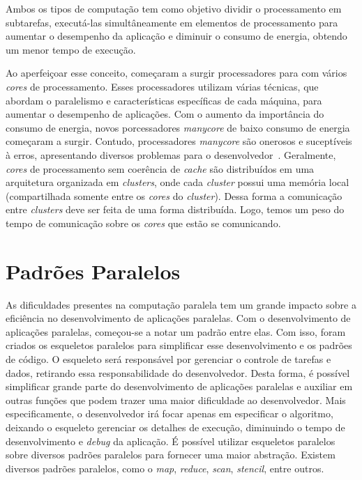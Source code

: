 
Ambos os tipos de computação tem como objetivo dividir o processamento em subtarefas, executá-las simultâneamente em elementos de processamento para aumentar o desempenho da aplicação e diminuir o consumo de energia, obtendo um menor tempo de execução.


Ao aperfeiçoar esse conceito, começaram a surgir processadores para \hpc com vários \textit{cores} de processamento. Esses processadores utilizam várias técnicas, que abordam o paralelismo e características específicas de cada máquina, para aumentar o desempenho de aplicações. Com o aumento da importância do consumo de energia, novos porcessadores \textit{manycore} de baixo consumo de energia começaram a surgir. Contudo, processadores \textit{manycore} são onerosos e suceptíveis à erros, apresentando diversos problemas para o desenvolvedor~\cite{pereira15}. Geralmente, \textit{cores} de processamento sem coerência de \textit{cache} são distribuídos em uma arquitetura organizada em \textit{clusters}, onde cada \textit{cluster} possui uma memória local (compartilhada somente entre os \textit{cores} do \textit{cluster}). Dessa forma a comunicação entre \textit{clusters} deve ser feita de uma forma distribuída. Logo, temos um peso do tempo de comunicação sobre os \textit{cores} que estão se comunicando.

\section{Padrões Paralelos}
As dificuldades presentes na computação paralela tem um grande impacto sobre a eficiência no desenvolvimento de aplicações paralelas. Com o desenvolvimento de aplicações paralelas, começou-se a notar um padrão entre elas. Com isso, foram criados os esqueletos paralelos para simplificar esse desenvolvimento e os padrões de código. O esqueleto será responsável por gerenciar o controle de tarefas e dados, retirando essa responsabilidade do desenvolvedor. Desta forma, é possível simplificar grande parte do desenvolvimento de aplicações paralelas e auxiliar em outras funções que podem trazer uma maior dificuldade ao desenvolvedor. Mais especificamente, o desenvolvedor irá focar apenas em especificar o algoritmo, deixando o esqueleto gerenciar os detalhes de execução, diminuindo o tempo de desenvolvimento e \textit{debug} da aplicação.
É possível utilizar esqueletos paralelos sobre diversos padrões paralelos para fornecer uma maior abstração. Existem diversos padrões paralelos, como o \textit{map}, \textit{reduce}, \textit{scan}, \textit{stencil}, entre outros.


